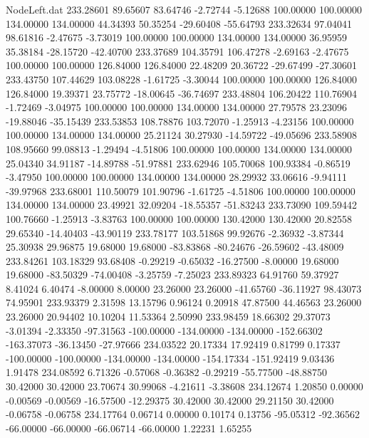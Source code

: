 \begin{filecontents}{NodeLeft.dat}
 233.28601   89.65607   83.64746    -2.72744   -5.12688  100.00000  100.00000  134.00000  134.00000   44.34393   50.35254  -29.60408  -55.64793
 233.32634   97.04041   98.61816    -2.47675   -3.73019  100.00000  100.00000  134.00000  134.00000   36.95959   35.38184  -28.15720  -42.40700
 233.37689  104.35791  106.47278    -2.69163   -2.47675  100.00000  100.00000  126.84000  126.84000   22.48209   20.36722  -29.67499  -27.30601
 233.43750  107.44629  103.08228    -1.61725   -3.30044  100.00000  100.00000  126.84000  126.84000   19.39371   23.75772  -18.00645  -36.74697
 233.48804  106.20422  110.76904    -1.72469   -3.04975  100.00000  100.00000  134.00000  134.00000   27.79578   23.23096  -19.88046  -35.15439
 233.53853  108.78876  103.72070    -1.25913   -4.23156  100.00000  100.00000  134.00000  134.00000   25.21124   30.27930  -14.59722  -49.05696
 233.58908  108.95660   99.08813    -1.29494   -4.51806  100.00000  100.00000  134.00000  134.00000   25.04340   34.91187  -14.89788  -51.97881
 233.62946  105.70068  100.93384    -0.86519   -3.47950  100.00000  100.00000  134.00000  134.00000   28.29932   33.06616   -9.94111  -39.97968
 233.68001  110.50079  101.90796    -1.61725   -4.51806  100.00000  100.00000  134.00000  134.00000   23.49921   32.09204  -18.55357  -51.83243
 233.73090  109.59442  100.76660    -1.25913   -3.83763  100.00000  100.00000  130.42000  130.42000   20.82558   29.65340  -14.40403  -43.90119
 233.78177  103.51868   99.92676    -2.36932   -3.87344   25.30938   29.96875   19.68000   19.68000  -83.83868  -80.24676  -26.59602  -43.48009
 233.84261  103.18329   93.68408    -0.29219   -0.65032  -16.27500   -8.00000   19.68000   19.68000  -83.50329  -74.00408   -3.25759   -7.25023
 233.89323   64.91760   59.37927     8.41024    6.40474   -8.00000    8.00000   23.26000   23.26000  -41.65760  -36.11927   98.43073   74.95901
 233.93379    2.31598   13.15796     0.96124    0.20918   47.87500   44.46563   23.26000   23.26000   20.94402   10.10204   11.53364    2.50990
 233.98459   18.66302   29.37073    -3.01394   -2.33350  -97.31563 -100.00000 -134.00000 -134.00000 -152.66302 -163.37073  -36.13450  -27.97666
 234.03522   20.17334   17.92419     0.81799    0.17337 -100.00000 -100.00000 -134.00000 -134.00000 -154.17334 -151.92419    9.03436    1.91478
 234.08592    6.71326   -0.57068    -0.36382   -0.29219  -55.77500  -48.88750   30.42000   30.42000   23.70674   30.99068   -4.21611   -3.38608
 234.12674    1.20850    0.00000    -0.00569   -0.00569  -16.57500  -12.29375   30.42000   30.42000   29.21150   30.42000   -0.06758   -0.06758
 234.17764    0.06714    0.00000     0.10174    0.13756  -95.05312  -92.36562  -66.00000  -66.00000  -66.06714  -66.00000    1.22231    1.65255

\end{filecontents}
